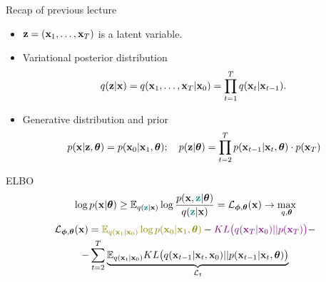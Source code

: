 \begin{frame}{Recap of previous lecture}
	\begin{itemize}
		\item $\mathbf{z} = (\mathbf{x}_1, \dots, \mathbf{x}_T)$ is a latent variable.
		\item Variational posterior distribution
		\vspace{-0.2cm}
		\[
			q(\mathbf{z} | \mathbf{x}) = q(\mathbf{x}_1, \dots, \mathbf{x}_T | \mathbf{x}_0) = \prod_{t = 1}^T q(\mathbf{x}_t | \mathbf{x}_{t - 1}).
		\]
		\vspace{-0.3cm}
		\item Generative distribution and prior
		\vspace{-0.2cm}
		\[
			p(\mathbf{x} | \mathbf{z}, \boldsymbol{\theta}) = p(\mathbf{x}_0 | \mathbf{x}_1, \boldsymbol{\theta}); \quad 
			p(\mathbf{z} | \boldsymbol{\theta}) = \prod_{t=2}^T p(\mathbf{x}_{t - 1} | \mathbf{x}_t, \boldsymbol{\theta}) \cdot p(\mathbf{x}_T)
		\]
	\end{itemize}
	\vspace{-0.2cm}
	\begin{block}{ELBO}
		\vspace{-0.2cm}
		\[
			\log p(\mathbf{x} | \boldsymbol{\theta}) \geq \mathbb{E}_{q({\color{teal}\mathbf{z}} | \mathbf{x})} \log \frac{p(\mathbf{x}, {\color{teal}\mathbf{z}} | \boldsymbol{\theta})}{q({\color{teal}\mathbf{z}} | \mathbf{x})} = \mathcal{L}_{\boldsymbol{\phi}, \boldsymbol{\theta}}(\mathbf{x}) \rightarrow \max_{q, \boldsymbol{\theta}}
		\]
		\vspace{-0.5cm}
		\begin{multline*}
			\cL_{\bphi, \btheta}(\bx) =  {\color{olive}\bbE_{q(\bx_1 | \bx_0)} \log p(\bx_0 | \bx_1, \btheta)} - {\color{violet}KL\bigl(q(\bx_T | \bx_0) || p(\bx_T)\bigr)} - \\
			- \sum_{t=2}^T  \underbrace{ \bbE_{q(\bx_t | \bx_0)}KL \bigl(q(\bx_{t-1} | \bx_t, \bx_0) || p(\bx_{t - 1} | \bx_t, \btheta )\bigr)}_{\cL_t}
		\end{multline*}
	\end{block}
\end{frame}
